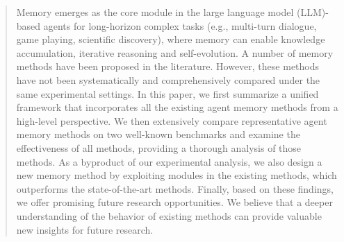\begin{abstract}
Memory emerges as the core module in the large language model (LLM)-based agents for long-horizon complex tasks (e.g., multi-turn dialogue, game playing, scientific discovery), where memory can enable knowledge accumulation, iterative reasoning and self-evolution.
%
A number of memory methods have been proposed in the literature. 
%
However, these methods have not been systematically and comprehensively compared under the same experimental settings.
%
In this paper, we first summarize a unified framework that incorporates all the existing agent memory methods from a high-level perspective.
%
We then extensively compare representative agent memory methods on two well-known benchmarks and examine the effectiveness of all methods, providing a thorough analysis of those methods.
%
As a byproduct of our experimental analysis, we also design a new memory method by exploiting modules in the existing methods, which outperforms the state-of-the-art methods.
%
Finally, based on these findings, we offer promising future research opportunities.
%
We believe that a deeper understanding of the behavior of existing methods can provide valuable new insights for future research.
\end{abstract}